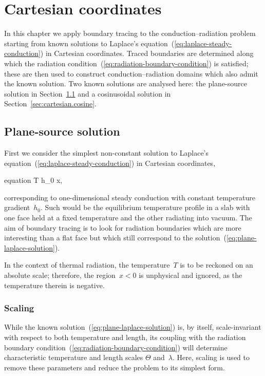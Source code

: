 \chapter{Cartesian coordinates}
\label{ch:cartesian}

In this chapter
we apply boundary tracing to the conduction--radiation problem
starting from known solutions
to Laplace's equation~(\ref{eq:laplace-steady-conduction})
in Cartesian coordinates.
Traced boundaries are determined along which
the radiation condition~(\ref{eq:radiation-boundary-condition})
is satisfied;
these are then used to construct conduction--radiation domains
which also admit the known solution.
Two known solutions are analysed here:
the plane-source solution in Section~\ref{sec:cartesian.plane}
and a cosinusoidal solution in Section~\ref{sec:cartesian.cosine}.

\section{Plane-source solution}
\label{sec:cartesian.plane}

First we consider the simplest non-constant solution
to Laplace's equation~(\ref{eq:laplace-steady-conduction})
in Cartesian coordinates,
\begin{important}{equation}
  T \ideq h_0 x,
  \label{eq:plane-laplace-solution}
\end{important}
corresponding to one-dimensional steady conduction
with constant temperature gradient~$h_0$.
Such would be the equilibrium temperature profile in a slab
with one face held at a fixed temperature
and the other radiating into vacuum.
The aim of boundary tracing is to look for radiation boundaries
which are more interesting than a flat face
but which still correspond to the solution~(\ref{eq:plane-laplace-solution}).

In the context of thermal radiation,
the temperature~$T$ is to be reckoned on an absolute scale;
therefore, the region~$x < 0$ is unphysical and ignored,
as the temperature therein is negative.

\subsection{Scaling}
\label{sec:cartesian.plane.scaling}

While the known solution~(\ref{eq:plane-laplace-solution}) is, by itself,
scale-invariant with respect to both temperature and length,
its coupling with
the radiation boundary condition~(\ref{eq:radiation-boundary-condition})
will determine characteristic temperature and length scales
$\Theta$ and~$\lambda$.
Here, scaling is used to remove these parameters
and reduce the problem to its simplest form.

